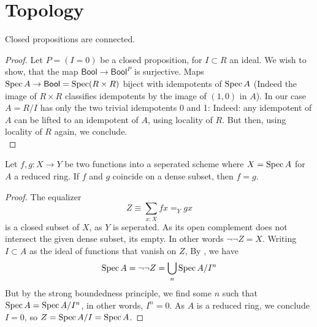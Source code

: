 \documentclass{article}
\newcommand{\Bool}{\mathsf{Bool}}
\begin{document}
\section{Topology}
\begin{lemma}{\label{lemma:clPropIsCnct}} %
	Closed propositions are connected.
\end{lemma}
\begin{proof}
	Let $P = (I = 0)$ be a closed proposition, for $I \subset R$ an ideal. We wish to show, that the map $\Bool \to \Bool^{P}$ is surjective. Maps $\Spec A \to \Bool = \Spec (R \times R)$ biject with idempotents of $\operatorname{Spec} A$ (Indeed the image of $R \times R$ classifies idempotents by the image of $(1,0)$ in $A$). In our case $A = R/I$ has only the two trivial idempotents 0 and 1: Indeed: any idempotent of $A$ can be lifted to an idempotent of $A$, using locality of $R$. But then, using locality of $R$ again, we conclude. \\
\end{proof}
\begin{lemma}{\label{lemma:Equalizer}}
	Let $f, g : X \to Y$ be two functions into a seperated scheme where $X = \operatorname{Spec} A$ for $A$ a reduced ring. If $f$ and $g$ coincide on a dense subset, then $f = g$.
\end{lemma}
\begin{proof}
	The equalizer 
	\[
	Z \equiv \sum_{x : X} f x =_Y g x
	\]
	is a closed subset of $X$, as $Y$ is seperated. As its open complement does not intersect the given dense subset, its empty. In other words $\lnot \lnot Z = X$. Writing $I \subset A$ as the ideal of functions that vanish on $Z$, By \cite{SAGtopology}, we have
	\[
	\operatorname{Spec} A = \lnot \lnot Z = \bigcup_{n} \operatorname{Spec} A / I^n
	\]
	But by the strong boundedness principle, we find some $n$ such that $\operatorname{Spec} A = \operatorname{Spec} A / I^n$, in other words, $I^n = 0$. As $A$ is a reduced ring, we conclude $I = 0$, so $Z = \operatorname{Spec} A / I = \operatorname{Spec} A$.
\end{proof}
\end{document}
